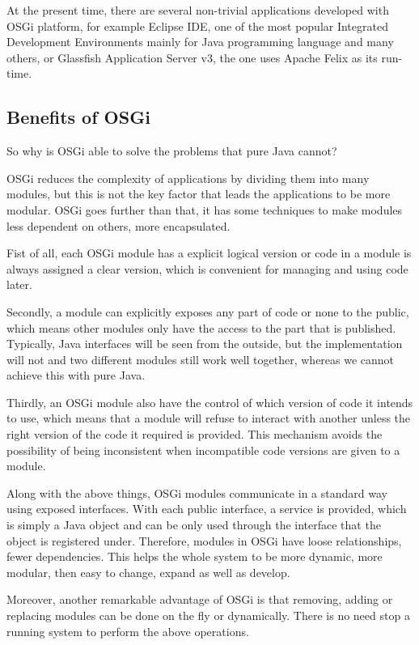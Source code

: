 At the present time, there are several non-trivial applications developed with OSGi platform, for example Eclipse IDE, one of the most popular Integrated Development Environments mainly for Java programming language and many others, or Glassfish Application Server v3, the one uses Apache Felix as its run-time. 

\subsection{Benefits of OSGi}
So why is OSGi able to solve the problems that pure Java cannot?

OSGi reduces the complexity of applications by dividing them into many modules, but this is not the key factor that leads the applications to be more modular. OSGi goes further than that, it has some techniques to make modules less dependent on others, more encapsulated.

Fist of all, each OSGi module has a explicit logical version or code in a module is always assigned a clear version, which is convenient for managing and using code later.

Secondly, a module can explicitly exposes any part of code or none to the public, which means other modules only have the access to the part that is published. Typically, Java interfaces will be seen from the outside, but the implementation will not and two different modules still work well together, whereas we cannot achieve this with pure Java.

Thirdly, an OSGi module also have the control of which version of code it intends to use, which means that a module will refuse to interact with another unless the right version of the code it required is provided. This mechanism avoids the possibility of being inconsistent when incompatible code versions are given to a module.

Along with the above things, OSGi modules communicate in a standard way using exposed interfaces. With each public interface, a service is provided, which is simply a Java object and can be only used through the interface that the object is registered under. Therefore, modules in OSGi have loose relationships, fewer dependencies. This helps the whole system to be more dynamic, more modular, then easy to change, expand as well as develop.

Moreover, another remarkable advantage of OSGi is that removing, adding or replacing modules can be done on the fly or dynamically. There is no need stop a running system to perform the above operations. 
